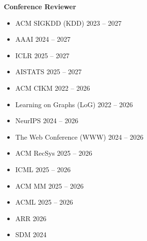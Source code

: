 \documentclass[11pt, letterpaper]{article}
\newcommand{\cvdate}[1]{{\small\color{MUTED}#1}}
\begin{document}
{\textbf{Conference Reviewer}
\begin{itemize}[leftmargin=1.5em,itemsep=0em,parsep=0em,topsep=0.3em]
    \item ACM SIGKDD (KDD) \hfill \cvdate{2023 -- 2027}
    \item AAAI \hfill \cvdate{2024 -- 2027}
    \item ICLR \hfill \cvdate{2025 -- 2027}
    \item AISTATS \hfill \cvdate{2025 -- 2027}
    \item ACM CIKM \hfill \cvdate{2022 -- 2026}
    \item Learning on Graphs (LoG) \hfill \cvdate{2022 -- 2026}
    \item NeurIPS \hfill \cvdate{2024 -- 2026}
    \item The Web Conference (WWW) \hfill \cvdate{2024 -- 2026}
    \item ACM RecSys \hfill \cvdate{2025 -- 2026}
    \item ICML \hfill \cvdate{2025 -- 2026}
    \item ACM MM \hfill \cvdate{2025 -- 2026}
    \item ACML \hfill \cvdate{2025 -- 2026}
    \item ARR \hfill \cvdate{2026}
    \item SDM \hfill \cvdate{2024}
\end{itemize}

}
\end{document}
